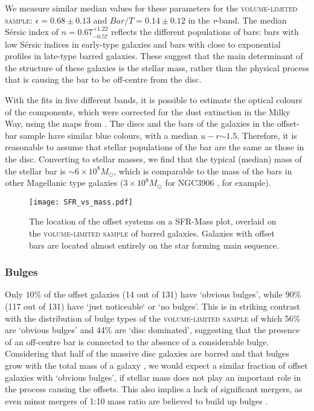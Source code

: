 \documentclass[a4paper,fleqn,usenatbib,useAMS]{mnras}
\begin{document}
We measure similar median values for these parameters for the \textsc{volume-limited sample}:  $\epsilon=0.68 \pm 0.13$ and $Bar/T=0.14\pm0.12$ in the \textit{r}-band. The median S\'ersic index of $n=0.67^{+1.22}_{-0.57}$ reflects the different populations of bars: bars with low S\'ersic indices in early-type galaxies and bars with close to exponential profiles in late-type barred galaxies. These suggest that the main determinant of the structure of these galaxies is the stellar mass, rather than the physical process that is causing the bar to be off-centre from the disc. 

With the fits in five different bands, it is possible to estimate the optical colours of the components, which were corrected for the dust extinction in the Milky Way, using the maps from \citet{Schlegel1998}. The discs and the bars of the galaxies in the offset-bar sample have similar blue colours, with a median $u-r $$\sim$$1.5$. Therefore, it is reasonable to assume that stellar populations of the bar are the same as those in the disc. Converting to stellar masses, we find that the typical (median) mass of the stellar bar is $\sim$$ 6 \times10^{8} M_{\odot}$, which is comparable to the mass of the bars in other Magellanic type galaxies ($3 \times10^{8} M_{\odot}$ for NGC3906 \citep{Swardt2015}, for example). 

\begin{figure}
 \texttt{[image: SFR\_vs\_mass.pdf]}
 \caption{The location of the offset systems on a SFR-Mass plot, overlaid on the \textsc{volume-limited sample} of barred galaxies. Galaxies with offset bars are located almost entirely on the star forming main sequence.}
 \label{MS}
\end{figure}


\subsubsection{Bulges}

Only $10\%$ of the offset galaxies (14 out of 131) have `obvious bulges', while $90\%$ (117 out of 131) have `just noticeable` or `no bulges'. This is in striking contrast with the distribution of bulge types of the \textsc{volume-limited sample} of which 56\% are `obvious bulges' and 44\% are `disc dominated', suggesting that the presence of an off-centre bar is connected to the absence of a considerable bulge. Considering that half of the massive disc galaxies are barred \citep{Masters2012} and that bulges grow with the total mass of a galaxy \citep{Kauffmann2003b}, we would expect a similar fraction of offset galaxies with `obvious bulges', if stellar mass does not play an important role in the process causing the offsets. This also implies a lack of significant mergers, as even minor mergers of 1:10 mass ratio are believed to build up bulges \citep{Walker1996}. 
\end{document}
